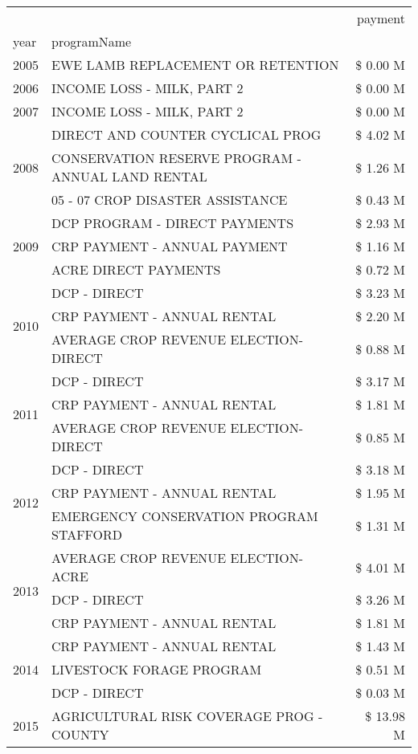 \begin{tabular}{llr}
\toprule
 &  & payment \\
year & programName &  \\
\midrule
2005 & EWE LAMB REPLACEMENT OR RETENTION & \$ 0.00 M \\
\cline{1-3}
2006 & INCOME LOSS - MILK, PART 2 & \$ 0.00 M \\
\cline{1-3}
2007 & INCOME LOSS - MILK, PART 2 & \$ 0.00 M \\
\cline{1-3}
\multirow[t]{3}{*}{2008} & DIRECT AND COUNTER CYCLICAL PROG & \$ 4.02 M \\
 & CONSERVATION RESERVE PROGRAM - ANNUAL LAND RENTAL & \$ 1.26 M \\
 & 05 - 07 CROP DISASTER ASSISTANCE & \$ 0.43 M \\
\cline{1-3}
\multirow[t]{3}{*}{2009} & DCP PROGRAM - DIRECT PAYMENTS & \$ 2.93 M \\
 & CRP PAYMENT - ANNUAL PAYMENT & \$ 1.16 M \\
 & ACRE DIRECT PAYMENTS & \$ 0.72 M \\
\cline{1-3}
\multirow[t]{3}{*}{2010} & DCP - DIRECT & \$ 3.23 M \\
 & CRP PAYMENT - ANNUAL RENTAL & \$ 2.20 M \\
 & AVERAGE CROP REVENUE ELECTION-DIRECT & \$ 0.88 M \\
\cline{1-3}
\multirow[t]{3}{*}{2011} & DCP - DIRECT & \$ 3.17 M \\
 & CRP PAYMENT - ANNUAL RENTAL & \$ 1.81 M \\
 & AVERAGE CROP REVENUE ELECTION-DIRECT & \$ 0.85 M \\
\cline{1-3}
\multirow[t]{3}{*}{2012} & DCP - DIRECT & \$ 3.18 M \\
 & CRP PAYMENT - ANNUAL RENTAL & \$ 1.95 M \\
 & EMERGENCY CONSERVATION PROGRAM STAFFORD & \$ 1.31 M \\
\cline{1-3}
\multirow[t]{3}{*}{2013} & AVERAGE CROP REVENUE ELECTION-ACRE & \$ 4.01 M \\
 & DCP - DIRECT & \$ 3.26 M \\
 & CRP PAYMENT - ANNUAL RENTAL & \$ 1.81 M \\
\cline{1-3}
\multirow[t]{3}{*}{2014} & CRP PAYMENT - ANNUAL RENTAL & \$ 1.43 M \\
 & LIVESTOCK FORAGE PROGRAM & \$ 0.51 M \\
 & DCP - DIRECT & \$ 0.03 M \\
\cline{1-3}
\multirow[t]{3}{*}{2015} & AGRICULTURAL RISK COVERAGE PROG - COUNTY & \$ 13.98 M \\

\end{tabular}
